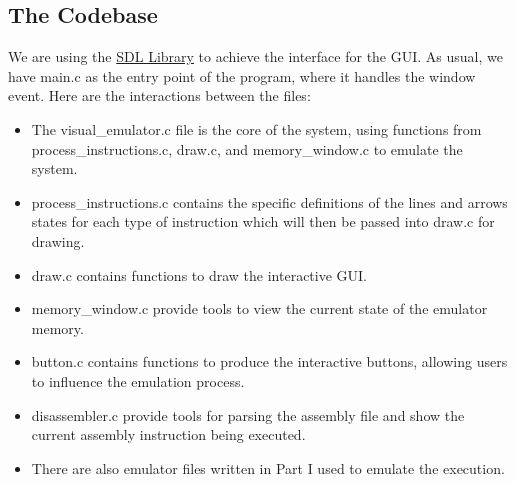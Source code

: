 \documentclass[10pt]{article}
\begin{document}
\subsection{The Codebase}
We are using the \href{https://www.libsdl.org/}{SDL Library} to achieve the interface for the GUI. As usual, we have main.c as the entry point of the program, where it handles the window event. Here are the interactions between the files:

\begin{itemize}
    \item The visual\_emulator.c file is the core of the system, using functions from process\_instructions.c, draw.c, and memory\_window.c to emulate the system.
    \item process\_instructions.c contains the specific definitions of the lines and arrows states for each type of instruction which will then be passed into draw.c for drawing.
    \item draw.c contains functions to draw the interactive GUI.
    \item memory\_window.c provide tools to view the current state of the emulator memory.
    \item button.c contains functions to produce the interactive buttons, allowing users to influence the emulation process.
    \item disassembler.c provide tools for parsing the assembly file and show the current assembly instruction being executed.
    \item There are also emulator files written in Part I used to emulate the execution.
\end{itemize}
\end{document}

